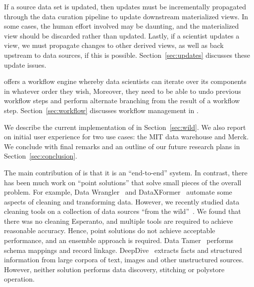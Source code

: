   If a source data set is updated, then updates must be incrementally propagated through the data curation pipeline to update downstream materialized views. In some cases, the human effort involved may be daunting, and the materialized view should be discarded rather than updated. Lastly, if a scientist updates a view, we must  propagate changes to other derived views, as well as back upstream to data sources, if this is possible. Section~\ref{sec:updates} discusses these update issues.



\stitle{[Workflow]} \dcv offers a workflow engine whereby data scientists can iterate over its components in whatever order they wish,  Moreover, they need to be able to undo previous workflow steps and perform alternate branching from the result of a workflow step.  Section~\ref{sec:workflow} discusses workflow management in \dcv.


We describe the current implementation of \dcv in Section~\ref{sec:wild}. We also report on initial user experience for two use cases: the MIT data warehouse and Merck. We conclude with final remarks and an outline of our future research plans in Section~\ref{sec:conclusion}.


The main contribution of \dcv is that it is an ``end-to-end'' system. In contrast, there has been much work on ``point solutions'' that solve small pieces of the overall problem. For example, Data Wrangler~\cite{2011-wrangler} and DataXFormer~\cite{DBLP:conf/icde/AbedjanMIOPS16} automate some aspects of cleaning and transforming data.
However, we recently studied data cleaning tools on a collection of data sources ``from the wild''~\cite{DBLP:journals/pvldb/AbedjanCDFIOPST16}. We found that there was no cleaning Esperanto, and multiple tools are required to achieve reasonable accuracy.  Hence, point solutions do not achieve acceptable performance, and an ensemble approach is required.
%
Data Tamer~\cite{DBLP:conf/cidr/StonebrakerBIBCZPX13} performs schema mappings and record linkage. DeepDive~\cite{DBLP:journals/pvldb/ShinWWSZR15} extracts facts and structured information from large corpora of text, images and other unstructured sources. However, neither solution performs data discovery, stitching or polystore operation.


